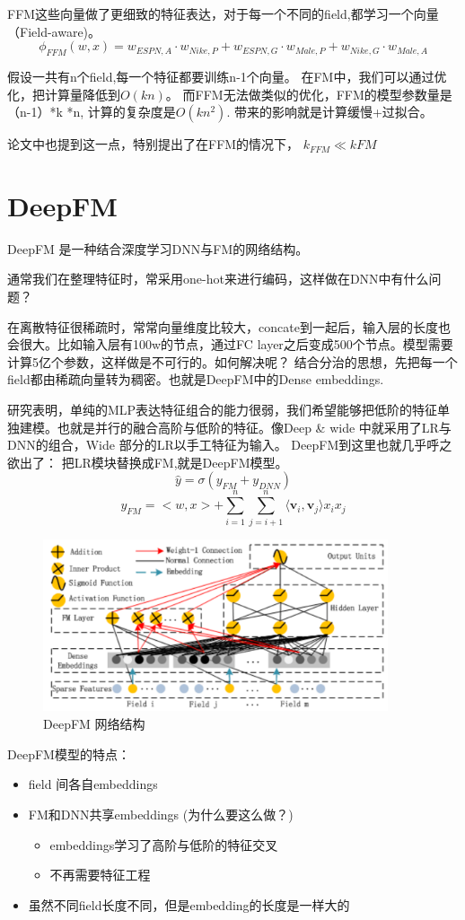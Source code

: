 \documentclass{article}
\begin{document}
\begin{CJK*}{UTF8}{gbsn}
FFM这些向量做了更细致的特征表达，对于每一个不同的field,都学习一个向量（Field-aware)。
$$\phi_{FFM}(w,x)=w_{ESPN,A}\cdot w_{Nike,P}+w_{ESPN,G}\cdot w_{Male,P}+w_{Nike,G}\cdot w_{Male,A}$$

假设一共有n个field,每一个特征都要训练n-1个向量。
在FM中，我们可以通过优化，把计算量降低到$O(kn)$。 而FFM无法做类似的优化，FFM的模型参数量是（n-1）*k *n, 计算的复杂度是$O(kn^{2})$. 带来的影响就是计算缓慢+过拟合。

论文中也提到这一点，特别提出了在FFM的情况下， $k_{FFM} \ll k{FM}$

\section{DeepFM}
DeepFM\cite{DBLP:journals/corr/GuoTYLH17} 是一种结合深度学习DNN与FM的网络结构。

通常我们在整理特征时，常采用one-hot来进行编码，这样做在DNN中有什么问题？

在离散特征很稀疏时，常常向量维度比较大，concate到一起后，输入层的长度也会很大。比如输入层有100w的节点，通过FC layer之后变成500个节点。模型需要计算5亿个参数，这样做是不可行的。如何解决呢？ 结合分治的思想，先把每一个field都由稀疏向量转为稠密。也就是DeepFM中的Dense embeddings.

研究表明，单纯的MLP表达特征组合的能力很弱，我们希望能够把低阶的特征单独建模。也就是并行的融合高阶与低阶的特征。像Deep \& wide 中就采用了LR与DNN的组合，Wide 部分的LR以手工特征为输入。 DeepFM到这里也就几乎呼之欲出了： 把LR模块替换成FM,就是DeepFM模型。
$$\widehat{y}=\sigma(y_{FM}+y_{DNN})$$
$$y_{FM}=<w,x>+\sum_{i=1}^{n}\sum_{j=i+1}^{n}\langle \textbf{v}_{i} ,\textbf{v}_{j} \rangle x_{i}x_{j}$$


\begin{figure}[H]
\centering
\includegraphics[width=4in,height=2in]{deepfm}
\caption{DeepFM 网络结构}
\end{figure}

DeepFM模型的特点：
\begin{itemize}
\item field 间各自embeddings
\item FM和DNN共享embeddings (为什么要这么做？)
\begin{itemize}
\item embeddings学习了高阶与低阶的特征交叉
\item 不再需要特征工程
\end{itemize}
\item 虽然不同field长度不同，但是embedding的长度是一样大的


\end{itemize}
\end{CJK*}
\end{document}
